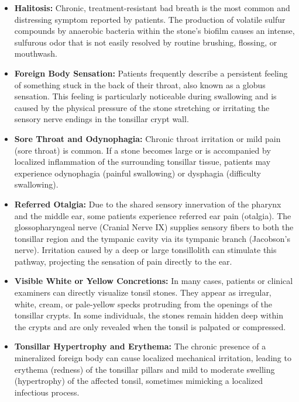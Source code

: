 \begin{itemize}
    \item \textbf{Halitosis:} Chronic, treatment-resistant bad breath is the most common and distressing symptom reported by patients. The production of volatile sulfur compounds by anaerobic bacteria within the stone's biofilm causes an intense, sulfurous odor that is not easily resolved by routine brushing, flossing, or mouthwash.
    \item \textbf{Foreign Body Sensation:} Patients frequently describe a persistent feeling of something stuck in the back of their throat, also known as a globus sensation. This feeling is particularly noticeable during swallowing and is caused by the physical pressure of the stone stretching or irritating the sensory nerve endings in the tonsillar crypt wall.
    \item \textbf{Sore Throat and Odynophagia:} Chronic throat irritation or mild pain (sore throat) is common. If a stone becomes large or is accompanied by localized inflammation of the surrounding tonsillar tissue, patients may experience odynophagia (painful swallowing) or dysphagia (difficulty swallowing).
    \item \textbf{Referred Otalgia:} Due to the shared sensory innervation of the pharynx and the middle ear, some patients experience referred ear pain (otalgia). The glossopharyngeal nerve (Cranial Nerve IX) supplies sensory fibers to both the tonsillar region and the tympanic cavity via its tympanic branch (Jacobson's nerve). Irritation caused by a deep or large tonsillolith can stimulate this pathway, projecting the sensation of pain directly to the ear.
    \item \textbf{Visible White or Yellow Concretions:} In many cases, patients or clinical examiners can directly visualize tonsil stones. They appear as irregular, white, cream, or pale-yellow specks protruding from the openings of the tonsillar crypts. In some individuals, the stones remain hidden deep within the crypts and are only revealed when the tonsil is palpated or compressed.
    \item \textbf{Tonsillar Hypertrophy and Erythema:} The chronic presence of a mineralized foreign body can cause localized mechanical irritation, leading to erythema (redness) of the tonsillar pillars and mild to moderate swelling (hypertrophy) of the affected tonsil, sometimes mimicking a localized infectious process.
\end{itemize}

